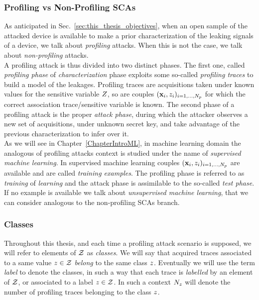 \subsubsection{Profiling vs Non-Profiling SCAs}
As anticipated in Sec.~\ref{sec:this_thesis_objectives}, when an open sample of the attacked device is available to make a prior characterization of the leaking signals of a device, we talk about \emph{profiling} attacks. When this is not the case, we talk about \emph{non-profiling} attacks. \\
A profiling attack is thus divided into two distinct phases. The first one, called \emph{profiling phase} of \emph{characterization} phase exploits some so-called \emph{profiling traces} to build a model of the leakages. Profiling traces are acquisitions taken under known values for the sensitive variable $Z$, so are couples $(\textbf{x}_i, z_i)_{i=1, \dots , N_p}$ for which the correct association trace/sensitive variable is known. The second phase of a profiling attack is the proper \emph{attack phase}, during which the attacker observes a new set of acquisitions, under unknown secret key, and take advantage of the previous characterization to infer over it. \\
As we will see in Chapter~\ref{ChapterIntroML}, in machine learning domain the analogous of profiling attacks context is studied under the name of \emph{supervised machine learning}. In supervised machine learning couples $(\textbf{x}_i, z_i)_{i=1, \dots , N_p}$ are available and are called \emph{training examples}. The profiling phase is referred to as \emph{training} of \emph{learning} and the attack phase is assimilable to the so-called \emph{test phase}. If no example is available we talk about \emph{unsupervised machine learning}, that we can consider analogous to the non-profiling SCAs branch. 

\subsubsection{Classes}
Throughout this thesis, and each time a profiling attack scenario is supposed,  we will refer to elements of $\mathcal{Z}$ as \emph{classes}. We will say that acquired traces associated to a same value $z\in\mathcal{Z}$ \emph{belong} to the same class $z$. Eventually we will use the term \emph{label} to denote the classes, in such a way that each trace is \emph{labelled} by an element of $\mathcal{Z}$, or associated to a label $z\in\mathcal{Z}$. In such a context $N_{z}$ will denote the number of profiling traces belonging to the class $z$.

